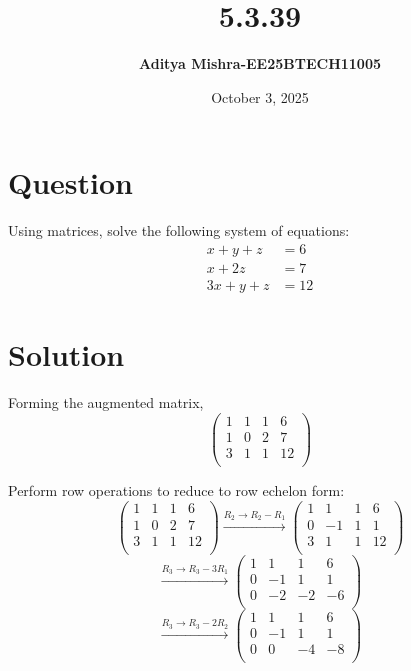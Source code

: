 \documentclass[14pt]{extarticle}
\title{\textbf{5.3.39}}
\author{\textbf{Aditya Mishra-EE25BTECH11005}}
\date{October 3, 2025}
\begin{document}
\maketitle

\section*{Question}
Using matrices, solve the following system of equations:
\begin{align*}
    x + y + z &= 6 \\
    x + 2z &= 7 \\
    3x + y + z &= 12 
\end{align*}

\section*{Solution}
Forming the augmented matrix,
\[
\left(
\begin{array}{ccc|c}
1 & 1 & 1 & 6 \\
1 & 0 & 2 & 7 \\
3 & 1 & 1 & 12 \\
\end{array}
\right)
\]

Perform row operations to reduce to row echelon form:
\[
\left(
\begin{array}{ccc|c}
1 & 1 & 1 & 6 \\
1 & 0 & 2 & 7 \\
3 & 1 & 1 & 12 \\
\end{array}
\right)
\xrightarrow{R_2 \rightarrow R_2 - R_1}
\left(
\begin{array}{ccc|c}
1 & 1 & 1 & 6 \\
0 & -1 & 1 & 1 \\
3 & 1 & 1 & 12 \\
\end{array}
\right)
\]
\[
\xrightarrow{R_3 \rightarrow R_3 - 3R_1}
\left(
\begin{array}{ccc|c}
1 & 1 & 1 & 6 \\
0 & -1 & 1 & 1 \\
0 & -2 & -2 & -6 \\
\end{array}
\right)
\]
\[
\xrightarrow{R_3 \rightarrow R_3 - 2R_2}
\left(
\begin{array}{ccc|c}
1 & 1 & 1 & 6 \\
0 & -1 & 1 & 1 \\
0 & 0 & -4 & -8 \\
\end{array}
\right)
\]
\end{document}
